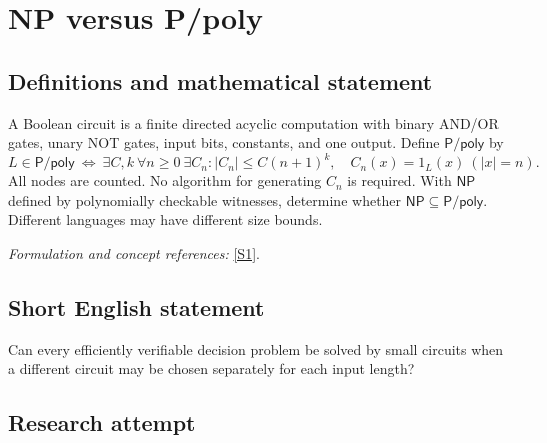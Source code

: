 \documentclass[11pt,a4paper]{article}
\newcommand{\sref}[2]{\hyperlink{source:#1:#2}{[S#2]}}
\newif\ifshowcatalogue
\newcommand{\cataloguescope}[1]{\ifshowcatalogue
 \paragraph{Exact scope in the supplied catalogue.}
 \begin{quote}\small #1\end{quote}\fi}
\begin{document}
\setcounter{section}{0}
\clearpage
\section*{\texorpdfstring{NP versus P/poly}{NP versus P/poly}}\label{30006678}
\subsection{Definitions and mathematical statement}
A Boolean circuit is a finite directed acyclic computation with binary AND/OR gates, unary NOT gates, input bits, constants, and one output. Define $\mathsf{P/poly}$ by
\[
 L\in\mathsf{P/poly}\ \Longleftrightarrow\ \exists C,k\ \forall n\ge0\ \exists C_n:
 |C_n|\le C(n+1)^k,\quad C_n(x)=1_L(x)\ (|x|=n).
\]
All nodes are counted. No algorithm for generating $C_n$ is required. With $\mathsf{NP}$ defined by polynomially checkable witnesses, determine whether $\mathsf{NP}\subseteq\mathsf{P/poly}$. Different languages may have different size bounds.
\par\smallskip\textit{Formulation and concept references:} \sref{30006678}{1}.
\cataloguescope{Determine the truth of NP subseteq P/poly. Here NP consists of languages over finite binary strings accepted by nondeterministic Turing machines in polynomial time. P/poly consists of languages L for which there exist constants C>=1 and integer k>=1 and Boolean circuits C\_n for all n>=0, of size at most C(n+1)\textasciicircum{}k, deciding membership in L on every length-n input. Circuits are finite acyclic single-output circuits with fan-in-two AND/OR, fan-in-one NOT, input bits and hardwired constants0/1; count all nodes. Each language has its own bound and circuit family, with no uniform generation requirement.}
\subsection{Short English statement}
Can every efficiently verifiable decision problem be solved by small circuits when a different circuit may be chosen separately for each input length?
\subsection{Research attempt}
\end{document}

